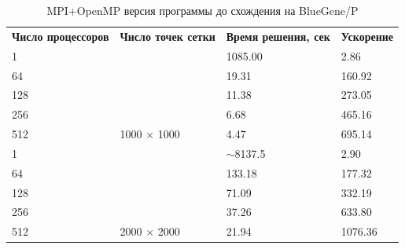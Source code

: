 \documentclass[12pt, a4paper]{article}
\begin{document}
        \begin{table}[H]
            \centering
            \caption{MPI+OpenMP версия программы до схождения на BlueGene/P}
            \label{tab:bg_omp_full}
            \begin{tabular}{llll}
            \rowcolor[HTML]{C0C0C0}
            \textbf{Число процессоров} & \textbf{Число точек сетки}                   & \textbf{Время решения, сек} & \textbf{Ускорение} \\
            \rowcolor[HTML]{EFEFEF}
            1                          & \multicolumn{1}{c}{\cellcolor[HTML]{EFEFEF}} & 1085.00                     & 2.86               \\
            64                         &                                              & 19.31                       & 160.92             \\
            128                        &                                              & 11.38                       & 273.05             \\
            256                        &                                              & 6.68                        & 465.16             \\
            512                        & \multirow{-4}{*}{1000 $\times$ 1000}         & 4.47                        & 695.14             \\
            \rowcolor[HTML]{EFEFEF}
            1                          &                                              & $\sim$8137.5                & 2.90               \\
            64                         &                                              & 133.18                      & 177.32             \\
            128                        &                                              & 71.09                       & 332.19             \\
            256                        &                                              & 37.26                       & 633.80             \\
            512                        & \multirow{-4}{*}{2000 $\times$ 2000}         & 21.94                       & 1076.36
            \end{tabular}
        \end{table}
\end{document}
